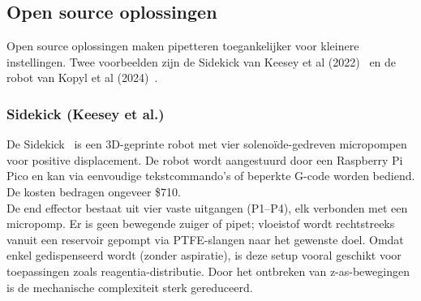 \subsection{Open source oplossingen}
Open source oplossingen maken pipetteren toegankelijker voor kleinere instellingen. Twee voorbeelden zijn de Sidekick van Keesey et al (2022)\ \cite{RN41} en de robot van Kopyl et al (2024)\ \cite{RN42}. 

\subsubsection{Sidekick (Keesey et al.)}
De Sidekick\ \cite{RN41} is een 3D-geprinte robot met vier solenoïde-gedreven micropompen voor positive displacement. De robot wordt aangestuurd door een Raspberry Pi Pico en kan via eenvoudige tekstcommando’s of beperkte G-code worden bediend. De kosten bedragen ongeveer \$710.
\\[12pt]De end effector bestaat uit vier vaste uitgangen (P1–P4), elk verbonden met een micropomp. Er is geen bewegende zuiger of pipet; vloeistof wordt rechtstreeks vanuit een reservoir gepompt via PTFE-slangen naar het gewenste doel. Omdat enkel gedispenseerd wordt (zonder aspiratie), is deze setup vooral geschikt voor toepassingen zoals reagentia-distributie. Door het ontbreken van z-as-bewegingen is de mechanische complexiteit sterk gereduceerd.

